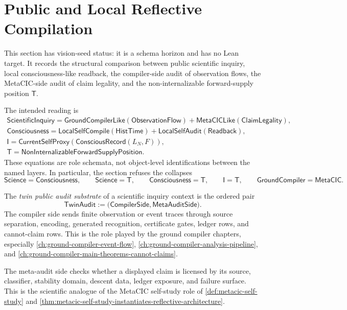 \section{Public and Local Reflective Compilation}
\label{sec:public-local-reflective-compilation}

\begin{remark}
\label{rem:public-local-reflective-compilation-vision-seed-status}
This section has vision-seed status: it is a schema horizon and has no
Lean target. It records the structural comparison between public
scientific inquiry, local consciousness-like readback, the compiler-side
audit of observation flows, the MetaCIC-side audit of claim legality, and
the non-internalizable forward-supply position $\mathsf{T}$.

The intended reading is
$$
\begin{gathered}
\mathsf{ScientificInquiry}
=
\mathsf{GroundCompilerLike}(\mathsf{ObservationFlow})
+
\mathsf{MetaCICLike}(\mathsf{ClaimLegality}),\\
\mathsf{Consciousness}
=
\mathsf{LocalSelfCompile}(\mathsf{HistTime})
+
\mathsf{LocalSelfAudit}(\mathsf{Readback}),\\
\mathsf{I}
=
\mathsf{CurrentSelfProxy}(\mathsf{ConsciousRecord}(L_N,F)),\\
\mathsf{T}
=
\mathsf{NonInternalizableForwardSupplyPosition}.
\end{gathered}
$$
These equations are role schemata, not object-level identifications
between the named layers. In particular, the section refuses the
collapses
$$
\mathsf{Science}=\mathsf{Consciousness},
\qquad
\mathsf{Science}=\mathsf{T},
\qquad
\mathsf{Consciousness}=\mathsf{T},
\qquad
\mathsf{I}=\mathsf{T},
\qquad
\mathsf{GroundCompiler}=\mathsf{MetaCIC}.
$$
\end{remark}

\begin{definition}
\label{def:twin-public-audit-substrate}
The \emph{twin public audit substrate} of a scientific inquiry context is
the ordered pair
$$
\mathsf{TwinAudit}
:=
\bigl(
\mathsf{CompilerSide},
\mathsf{MetaAuditSide}
\bigr).
$$
The compiler side sends finite observation or event traces through
source separation, encoding, generated recognition, certificate gates,
ledger rows, and cannot-claim rows. This is the role played by the ground
compiler chapters, especially
\autoref{ch:ground-compiler-event-flow},
\autoref{ch:ground-compiler-analysis-pipeline}, and
\autoref{ch:ground-compiler-main-theorems-cannot-claims}.

The meta-audit side checks whether a displayed claim is licensed by its
source, classifier, stability domain, descent data, ledger exposure, and
failure surface. This is the scientific analogue of the MetaCIC
self-study role of \autoref{def:metacic-self-study} and
\autoref{thm:metacic-self-study-instantiates-reflective-architecture}.
\end{definition}

